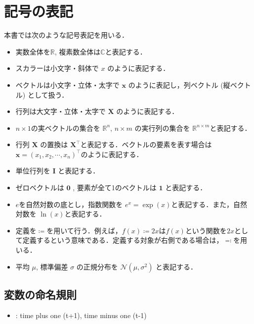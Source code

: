 \section{記号の表記
}
本書では次のような記号表記を用いる．
\begin{itemize}
\item 実数全体を$\mathbb{R}$, 複素数全体は$\mathbb{C}$と表記する．
\item スカラーは小文字・斜体で $x$ のように表記する．
\item ベクトルは小文字・立体・太字で $\mathbf{x}$ のように表記し，列ベクトル (縦ベクトル) として扱う．
\item 行列は大文字・立体・太字で $\mathbf{X}$ のように表記する．
\item $n\times 1$の実ベクトルの集合を $\mathbb{R}^n$, $n\times m$ の実行列の集合を $\mathbb{R}^{n\times m}$と表記する．
\item 行列 $\mathbf{X}$ の置換は $\mathbf{X}^\top$と表記する．ベクトルの要素を表す場合は $\mathbf{x} = (x_1, x_2,\cdots, x_n)^\top$のように表記する．
\item 単位行列を $\mathbf{I}$ と表記する．
\item ゼロベクトルは $\mathbf{0}$ , 要素が全て1のベクトルは $\mathbf{1}$ と表記する．  
\item $e$を自然対数の底とし，指数関数を $e^x=\exp(x)$と表記する．また，自然対数を $\ln(x)$と表記する．
\item 定義を$\coloneqq$を用いて行う．例えば，$f(x)\coloneqq2x$は$f(x)$という関数を$2x$として定義するという意味である．定義する対象が右側である場合は，$\eqqcolon$を用いる．
\item 平均 $\mu$, 標準偏差 $\sigma$ の正規分布を $\mathcal{N}(\mu, \sigma^2)$ と表記する．
\end{itemize}
\subsection{変数の命名規則
}
\begin{itemize}
\item {} : time plus one (t+1), time minus one (t-1)
\end{itemize}
